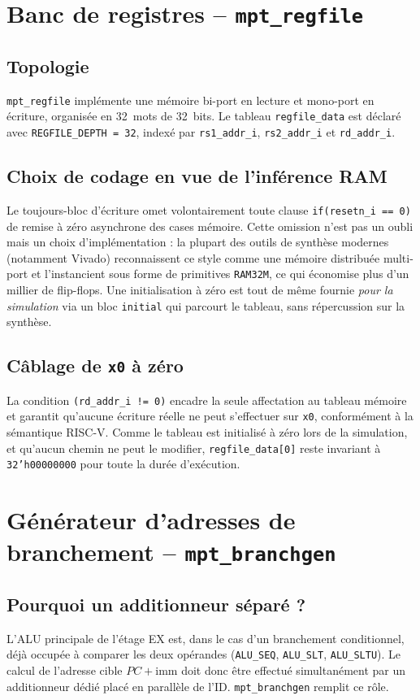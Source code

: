 \documentclass[11pt,a4paper,oneside]{report}
\begin{document}
\section{Banc de registres -- \texttt{mpt\_regfile}}
\label{sec:regfile}

\subsection{Topologie}
\texttt{mpt\_regfile} implémente une mémoire bi-port en lecture et
mono-port en écriture, organisée en 32~mots de 32~bits. Le tableau
\texttt{regfile\_data} est déclaré avec
\texttt{REGFILE\_DEPTH = 32}, indexé par \texttt{rs1\_addr\_i},
\texttt{rs2\_addr\_i} et \texttt{rd\_addr\_i}.

\subsection{Choix de codage en vue de l'inférence RAM}
Le toujours-bloc d'écriture omet volontairement toute clause
\texttt{if(resetn\_i == 0)} de remise à zéro asynchrone des cases
mémoire. Cette omission n'est pas un oubli mais un choix
d'implémentation : la plupart des outils de synthèse modernes
(notamment Vivado) reconnaissent ce style comme une mémoire
distribuée multi-port et l'instancient sous forme de primitives
\texttt{RAM32M}, ce qui économise plus d'un millier de
flip-flops. Une initialisation à zéro est tout de même fournie
\textit{pour la simulation} via un bloc \texttt{initial} qui
parcourt le tableau, sans répercussion sur la synthèse.

\subsection{Câblage de \texttt{x0} à zéro}
La condition \texttt{(rd\_addr\_i != 0)} encadre la seule
affectation au tableau mémoire et garantit qu'aucune écriture
réelle ne peut s'effectuer sur \texttt{x0}, conformément à la
sémantique RISC-V. Comme le tableau est initialisé à zéro lors de
la simulation, et qu'aucun chemin ne peut le modifier,
\texttt{regfile\_data[0]} reste invariant à \texttt{32'h00000000}
pour toute la durée d'exécution.


\section{Générateur d'adresses de branchement -- \texttt{mpt\_branchgen}}
\label{sec:branchgen}

\subsection{Pourquoi un additionneur séparé ?}
L'ALU principale de l'étage EX est, dans le cas d'un branchement
conditionnel, déjà occupée à comparer les deux opérandes
(\texttt{ALU\_SEQ}, \texttt{ALU\_SLT}, \texttt{ALU\_SLTU}). Le
calcul de l'adresse cible $PC + \text{imm}$ doit donc être
effectué simultanément par un additionneur dédié placé en parallèle
de l'ID. \texttt{mpt\_branchgen} remplit ce rôle.
\end{document}
